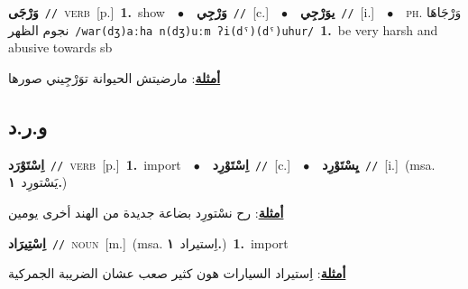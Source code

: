 \documentclass[10pt,a4paper,twoside]{article} %
\begin{document}
\begin{multicols}{2}
{\setlength\topsep{0pt}\textbf{\foreignlanguage{arabic}{وَرْجَى}}\ {\color{gray}\texttt{//}\color{black}}\ \textsc{verb}\ [p.]\ \textbf{1.}~show\ \ $\bullet$\ \ \setlength\topsep{0pt}\textbf{\foreignlanguage{arabic}{وَرْجِي}}\ {\color{gray}\texttt{//}\color{black}}\ [c.]\ \ $\bullet$\ \ \setlength\topsep{0pt}\textbf{\foreignlanguage{arabic}{يوَرْجِي}}\ {\color{gray}\texttt{//}\color{black}}\ [i.]\ \ $\bullet$\ \ \textsc{ph.} \color{gray} \foreignlanguage{arabic}{وَرْجَاهَا نجوم الظهر}\color{black}\ {\color{gray}\texttt{/{\sffamily war(dʒ)aːha n(dʒ)uːm ʔi(dˤ)(dˤ)uhur}/}\color{black}}\ \textbf{1.}~be very harsh and abusive towards sb\  \begin{flushright}\color{gray}\foreignlanguage{arabic}{\textbf{\underline{\foreignlanguage{arabic}{أمثلة}}}: مارضيتش الحيوانة توَرْجِيني صورها}\end{flushright}\color{black}} \vspace{2mm}

\vspace{-3mm}
\subsection*{\color{blue}\foreignlanguage{arabic}{و.ر.د}\color{blue}{}} 

{\setlength\topsep{0pt}\textbf{\foreignlanguage{arabic}{اِسْتَوْرَد}}\ {\color{gray}\texttt{//}\color{black}}\ \textsc{verb}\ [p.]\ \textbf{1.}~import\ \ $\bullet$\ \ \setlength\topsep{0pt}\textbf{\foreignlanguage{arabic}{اِسْتَوْرِد}}\ {\color{gray}\texttt{//}\color{black}}\ [c.]\ \ $\bullet$\ \ \setlength\topsep{0pt}\textbf{\foreignlanguage{arabic}{يِسْتَوْرِد}}\ {\color{gray}\texttt{//}\color{black}}\ [i.]\ \color{gray}(msa. \foreignlanguage{arabic}{يَسْتورِد}~\foreignlanguage{arabic}{\textbf{١.}})\color{black}\  \begin{flushright}\color{gray}\foreignlanguage{arabic}{\textbf{\underline{\foreignlanguage{arabic}{أمثلة}}}: رح نسْتورِد بضاعة جديدة من الهند أخرى يومين}\end{flushright}\color{black}} \vspace{2mm}

{\setlength\topsep{0pt}\textbf{\foreignlanguage{arabic}{اِسْتِيرَاد}}\ {\color{gray}\texttt{//}\color{black}}\ \textsc{noun}\ [m.]\ \color{gray}(msa. \foreignlanguage{arabic}{اِستيراد}~\foreignlanguage{arabic}{\textbf{١.}})\color{black}\ \textbf{1.}~import\  \begin{flushright}\color{gray}\foreignlanguage{arabic}{\textbf{\underline{\foreignlanguage{arabic}{أمثلة}}}: اِستيراد السيارات هون كثير صعب عشان الضريبة الجمركية}\end{flushright}\color{black}} \vspace{2mm}


\end{multicols}
\end{document}
